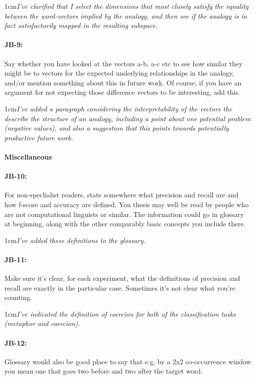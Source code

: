 \documentclass[11pt,a4paper]{article}
\newcommand{\res}[1]{\vspace{0.25cm} \begin{adjustwidth}{1cm}{}\emph{#1}\end{adjustwidth}}
\begin{document}
\res{I've clarified that I select the dimensions that most closely satisfy the equality between the word-vectors implied by the analogy, and then see if the analogy is in fact satisfactorily mapped in the resulting subspace.}

\paragraph{JB-9:} Say whether you have looked at the vectors a-b, a-c etc to see how similar they might be to vectors for the expected underlying relationships in the analogy, and/or mention something about this in future work. Of course, if you have an argument for not expecting those difference vectors to be interesting, add this.

\res{I've added a paragraph considering the interpretability of the vectors the describe the structure of an analogy, including a point about one potential problem (negative values), and also a suggestion that this points towards potentially productive future work.}


\paragraph{Miscellaneous}

\paragraph{JB-10:} For non-speclialist readers, state somewhere what precision and recall are and how f-score and accuracy are defined. You thesis may well be read by people who are not computational linguists or similar. The information could go in glossary at beginning, along with the other comparably basic concepts you include there.

\res{I've added these definitions to the glossary.}

\paragraph{JB-11:} Make sure it's clear, for each experiment, what the definitions of precision and recall are exactly in the particular case. Sometimes it's not clear what you're counting.

\res{I've indicated the definition of coercion for both of the classification tasks (metaphor and coercion).}

\paragraph{JB-12:} Glossary would also be good place to say that e.g. by a 2x2 co-occurrence window you mean one that goes two before and two after the target word.
\end{document}
